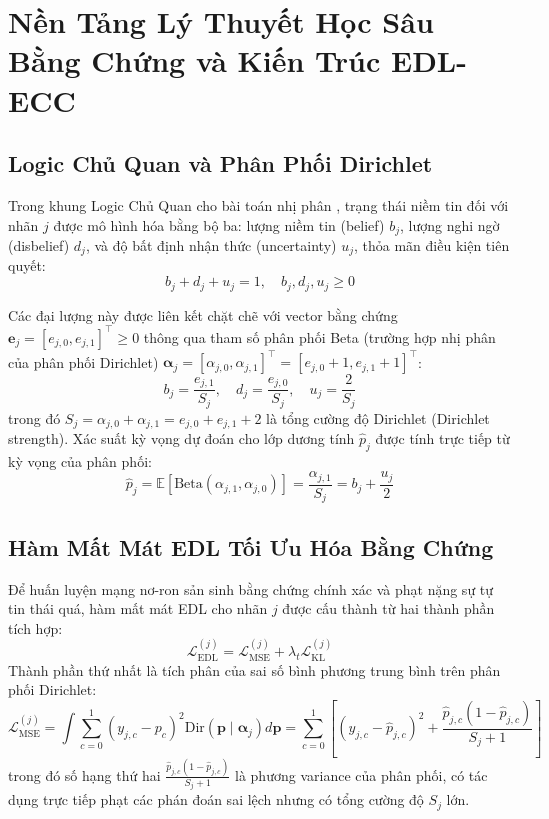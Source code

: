 \documentclass[1p,times]{elsarticle}
\begin{document}
\section{Nền Tảng Lý Thuyết Học Sâu Bằng Chứng và Kiến Trúc EDL-ECC}
\label{sec:method}

\subsection{Logic Chủ Quan và Phân Phối Dirichlet}
Trong khung Logic Chủ Quan cho bài toán nhị phân \citep{josang2016subjective}, trạng thái niềm tin đối với nhãn $j$ được mô hình hóa bằng bộ ba: lượng niềm tin (belief) $b_j$, lượng nghi ngờ (disbelief) $d_j$, và độ bất định nhận thức (uncertainty) $u_j$, thỏa mãn điều kiện tiên quyết:
\begin{equation}
    b_j + d_j + u_j = 1, \quad b_j, d_j, u_j \ge 0
\end{equation}

Các đại lượng này được liên kết chặt chẽ với vector bằng chứng $\mathbf{e}_j = [e_{j,0}, e_{j,1}]^\top \ge 0$ thông qua tham số phân phối Beta (trường hợp nhị phân của phân phối Dirichlet) $\boldsymbol{\alpha}_j = [\alpha_{j,0}, \alpha_{j,1}]^\top = [e_{j,0} + 1, e_{j,1} + 1]^\top$:
\begin{equation}
    b_j = \frac{e_{j,1}}{S_j}, \quad d_j = \frac{e_{j,0}}{S_j}, \quad u_j = \frac{2}{S_j}
\end{equation}
trong đó $S_j = \alpha_{j,0} + \alpha_{j,1} = e_{j,0} + e_{j,1} + 2$ là tổng cường độ Dirichlet (Dirichlet strength). Xác suất kỳ vọng dự đoán cho lớp dương tính $\hat{p}_j$ được tính trực tiếp từ kỳ vọng của phân phối:
\begin{equation}
    \hat{p}_j = \mathbb{E}[\text{Beta}(\alpha_{j,1}, \alpha_{j,0})] = \frac{\alpha_{j,1}}{S_j} = b_j + \frac{u_j}{2}
\end{equation}

\subsection{Hàm Mất Mát EDL Tối Ưu Hóa Bằng Chứng}
Để huấn luyện mạng nơ-ron sản sinh bằng chứng chính xác và phạt nặng sự tự tin thái quá, hàm mất mát EDL cho nhãn $j$ được cấu thành từ hai thành phần tích hợp:
\begin{equation}
    \mathcal{L}_{\text{EDL}}^{(j)} = \mathcal{L}_{\text{MSE}}^{(j)} + \lambda_t \mathcal{L}_{\text{KL}}^{(j)}
\end{equation}
Thành phần thứ nhất là tích phân của sai số bình phương trung bình trên phân phối Dirichlet:
\begin{equation}
    \mathcal{L}_{\text{MSE}}^{(j)} = \int \sum_{c=0}^1 (y_{j,c} - p_c)^2 \text{Dir}(\mathbf{p} \mid \boldsymbol{\alpha}_j) d\mathbf{p} = \sum_{c=0}^1 \left[ (y_{j,c} - \hat{p}_{j,c})^2 + \frac{\hat{p}_{j,c}(1 - \hat{p}_{j,c})}{S_j + 1} \right]
\end{equation}
trong đó số hạng thứ hai $\frac{\hat{p}_{j,c}(1 - \hat{p}_{j,c})}{S_j + 1}$ là phương variance của phân phối, có tác dụng trực tiếp phạt các phán đoán sai lệch nhưng có tổng cường độ $S_j$ lớn.
\end{document}
